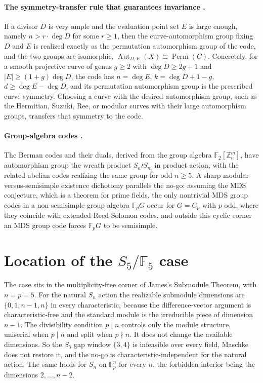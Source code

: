 \documentclass[11pt]{article}
\newcommand{\F}{\mathbb{F}}
\newcommand{\GF}[1]{\mathbb{F}_{#1}}
\newcommand{\Sym}{S}
\newcommand{\Aut}{\operatorname{Aut}}
\newcommand{\Perm}{\operatorname{Perm}}
\begin{document}
\paragraph{The symmetry-transfer rule that guarantees invariance \cite{joynerksir2008}.}
If a divisor $D$ is very ample and the evaluation point set $E$ is large enough, namely
$n > r \cdot \deg D$ for some $r \geq 1$, then the curve-automorphism group fixing $D$ and
$E$ is realized exactly as the permutation automorphism group of the code, and the two
groups are isomorphic, $\Aut_{D,E}(X) \cong \Perm(C)$. Concretely, for a smooth projective
curve of genus $g \geq 2$ with $\deg D \geq 2g+1$ and $|E| \geq (1+g)\deg D$, the code has
$n = \deg E$, $k = \deg D + 1 - g$, $d \geq \deg E - \deg D$, and its permutation
automorphism group is the prescribed curve symmetry. Choosing a curve with the desired
automorphism group, such as the Hermitian, Suzuki, Ree, or modular curves with their large
automorphism groups, transfers that symmetry to the code.

\paragraph{Group-algebra codes \cite{pandeykrishnan2026,garciaclaro2020}.}
The Berman codes and their duals, derived from the group algebra $\F_2[\mathbb{Z}_n^m]$,
have automorphism group the wreath product $\Sym_n \wr \Sym_m$ in product action, with the
related abelian codes realizing the same group for odd $n \geq 5$. A sharp
modular-versus-semisimple existence dichotomy parallels the no-go: assuming the MDS
conjecture, which is a theorem for prime fields, the only nontrivial MDS group codes in a
non-semisimple group algebra $\F_p G$ occur for $G = C_p$ with $p$ odd, where they coincide
with extended Reed-Solomon codes, and outside this cyclic corner an MDS group code forces
$\F_p G$ to be semisimple.

\section{Location of the $\Sym_5/\GF{5}$ case}

The case sits in the multiplicity-free corner of James's Submodule Theorem, with
$n = p = 5$. For the natural $\Sym_n$ action the realizable submodule dimensions are
$\{0,1,n-1,n\}$ in every characteristic, because the difference-vector argument is
characteristic-free and the standard module is the irreducible piece of dimension $n-1$.
The divisibility condition $p \mid n$ controls only the module structure, uniserial when
$p \mid n$ and split when $p \nmid n$. It does not change the available dimensions. So the
$\Sym_5$ gap window $\{3,4\}$ is infeasible over every field, Maschke does not restore it,
and the no-go is characteristic-independent for the natural action. The same holds for
$\Sym_n$ on $\GF{p}^n$ for every $n$, the forbidden interior being the dimensions
$2, \dots, n-2$.
\end{document}
